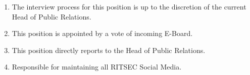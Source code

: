 
\begin{enumerate}
  \item The interview process for this position is up to the discretion of the current Head of Public Relations.
  \item This position is appointed by a vote of incoming E-Board.
  \item This position directly reports to the Head of Public Relations.
  \item Responsible for maintaining all RITSEC Social Media. 
\end{enumerate}
